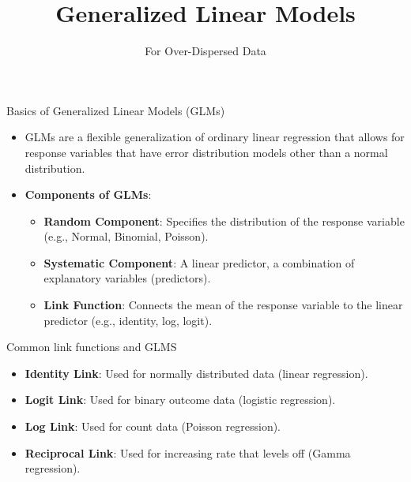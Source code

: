 \documentclass[
  ignorenonframetext,
]{beamer}
\title{Generalized Linear Models}
\subtitle{For Over-Dispersed Data}
\author{}
\date{}
\providecommand{\tightlist}{%
  \setlength{\itemsep}{0pt}\setlength{\parskip}{0pt}}\usepackage{longtable,booktabs,array}
\begin{document}
\frame{\titlepage}


\begin{frame}{Basics of Generalized Linear Models (GLMs)}
\protect\hypertarget{basics-of-generalized-linear-models-glms}{}
\begin{itemize}
\tightlist
\item
  GLMs are a flexible generalization of ordinary linear regression that
  allows for response variables that have error distribution models
  other than a normal distribution.
\item
  \textbf{Components of GLMs}:

  \begin{itemize}
  \tightlist
  \item
    \textbf{Random Component}: Specifies the distribution of the
    response variable (e.g., Normal, Binomial, Poisson).
  \item
    \textbf{Systematic Component}: A linear predictor, a combination of
    explanatory variables (predictors).
  \item
    \textbf{Link Function}: Connects the mean of the response variable
    to the linear predictor (e.g., identity, log, logit).
  \end{itemize}
\end{itemize}
\end{frame}

\begin{frame}{Common link functions and GLMS}
\protect\hypertarget{common-link-functions-and-glms}{}
\begin{itemize}
\tightlist
\item
  \textbf{Identity Link}: Used for normally distributed data (linear
  regression).
\item
  \textbf{Logit Link}: Used for binary outcome data (logistic
  regression).
\item
  \textbf{Log Link}: Used for count data (Poisson regression).
\item
  \textbf{Reciprocal Link}: Used for increasing rate that levels off
  (Gamma regression).
\end{itemize}
\end{frame}
\end{document}
